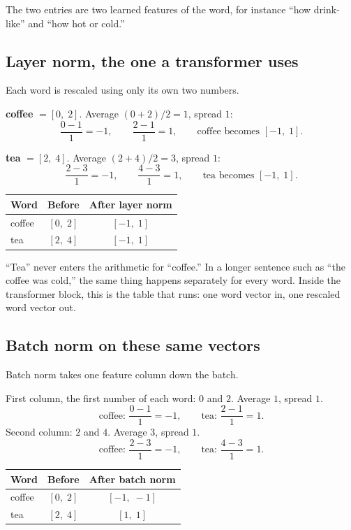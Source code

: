 \documentclass[11pt]{article}
\begin{document}
The two entries are two learned features of the word, for instance ``how
drink-like'' and ``how hot or cold.''

\subsection{Layer norm, the one a transformer uses}

Each word is rescaled using only its own two numbers.

\textbf{coffee} \(= [0,\; 2]\). Average \((0+2)/2 = 1\), spread \(1\):
\[
  \frac{0-1}{1} = -1,
  \qquad
  \frac{2-1}{1} = 1,
  \qquad
  \text{coffee becomes } [-1,\; 1].
\]

\textbf{tea} \(= [2,\; 4]\). Average \((2+4)/2 = 3\), spread \(1\):
\[
  \frac{2-3}{1} = -1,
  \qquad
  \frac{4-3}{1} = 1,
  \qquad
  \text{tea becomes } [-1,\; 1].
\]

\begin{center}
\begin{tabular}{@{}lcc@{}}
\toprule
Word & Before & After layer norm \\
\midrule
coffee & \([0,\; 2]\) & \([-1,\; 1]\) \\
tea & \([2,\; 4]\) & \([-1,\; 1]\) \\
\bottomrule
\end{tabular}
\end{center}

``Tea'' never enters the arithmetic for ``coffee.'' In a longer sentence
such as ``the coffee was cold,'' the same thing happens separately for
every word. Inside the transformer block, this is the table that runs:
one word vector in, one rescaled word vector out.

\subsection{Batch norm on these same vectors}

Batch norm takes one feature column down the batch.

First column, the first number of each word: \(0\) and \(2\). Average \(1\),
spread \(1\).
\[
  \text{coffee: }\frac{0-1}{1} = -1,
  \qquad
  \text{tea: }\frac{2-1}{1} = 1.
\]
Second column: \(2\) and \(4\). Average \(3\), spread \(1\).
\[
  \text{coffee: }\frac{2-3}{1} = -1,
  \qquad
  \text{tea: }\frac{4-3}{1} = 1.
\]

\begin{center}
\begin{tabular}{@{}lcc@{}}
\toprule
Word & Before & After batch norm \\
\midrule
coffee & \([0,\; 2]\) & \([-1,\; -1]\) \\
tea & \([2,\; 4]\) & \([1,\; 1]\) \\
\bottomrule
\end{tabular}
\end{center}
\end{document}
